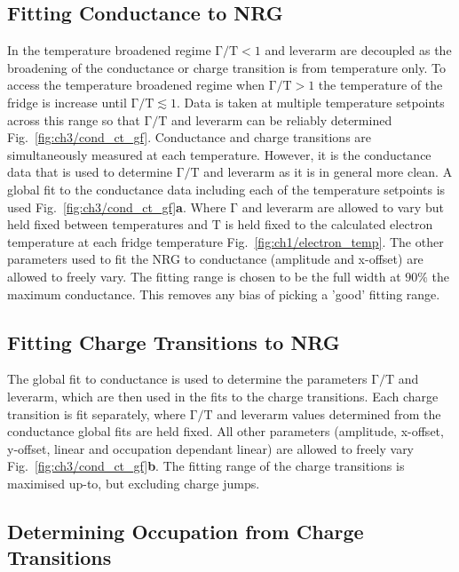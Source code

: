 \subsection{Fitting Conductance to NRG}
In the temperature broadened regime $\mathrm{\Gamma/T} < 1$ and leverarm are decoupled as the broadening of the conductance or charge transition is from temperature only. To access the temperature broadened regime when $\mathrm{\Gamma/T} > 1$ the temperature of the fridge is increase until $\mathrm{\Gamma/T} \lesssim 1$. Data is taken at multiple temperature setpoints across this range so that  $\mathrm{\Gamma/T}$ and leverarm can be reliably determined Fig.~\ref{fig:ch3/cond_ct_gf}. Conductance and charge transitions are simultaneously measured at each temperature. However, it is the conductance data that is used to determine $\mathrm{\Gamma/T}$ and leverarm as it is in general more clean. A global fit to the conductance data including each of the temperature setpoints is used Fig.~\ref{fig:ch3/cond_ct_gf}\textbf{a}. Where $\mathrm{\Gamma}$ and leverarm are allowed to vary but held fixed between temperatures and $\mathrm{T}$ is held fixed to the calculated electron temperature at each fridge temperature Fig.~\ref{fig:ch1/electron_temp}. The other parameters used to fit the NRG to conductance (amplitude and x-offset) are allowed to freely vary.
The fitting range is chosen to be the full width at $90\%$ the maximum conductance. This removes any bias of picking a 'good' fitting range. 

\subsection{Fitting Charge Transitions to NRG}
The global fit to conductance is used to determine the parameters $\mathrm{\Gamma/T}$ and leverarm, which are then used in the fits to the charge transitions. Each charge transition is fit separately, where $\mathrm{\Gamma/T}$ and leverarm values determined from the conductance global fits are held fixed. All other parameters (amplitude, x-offset, y-offset, linear and occupation dependant linear) are allowed to freely vary Fig.~\ref{fig:ch3/cond_ct_gf}\textbf{b}. The fitting range of the charge transitions is maximised up-to, but excluding charge jumps.


\subsection{Determining Occupation from Charge Transitions}

